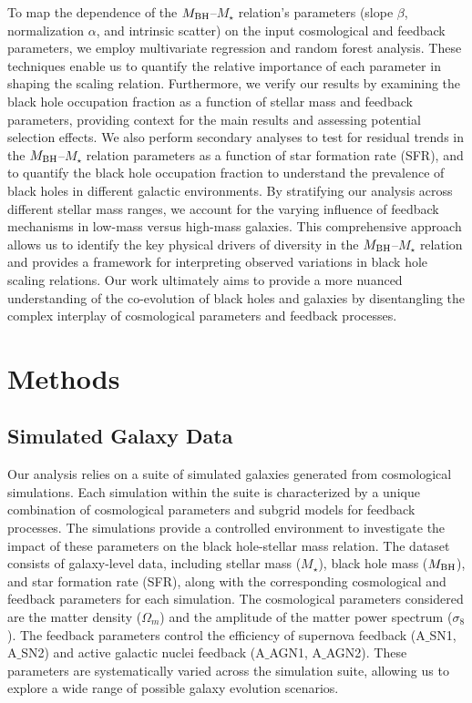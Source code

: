 \documentclass[twocolumn]{aastex631}
\begin{document}
To map the dependence of the $M_{\rm BH}$--$M_{\star}$ relation's parameters (slope $\beta$, normalization $\alpha$, and intrinsic scatter) on the input cosmological and feedback parameters, we employ multivariate regression and random forest analysis. These techniques enable us to quantify the relative importance of each parameter in shaping the scaling relation. Furthermore, we verify our results by examining the black hole occupation fraction as a function of stellar mass and feedback parameters, providing context for the main results and assessing potential selection effects. We also perform secondary analyses to test for residual trends in the $M_{\rm BH}$--$M_{\star}$ relation parameters as a function of star formation rate (SFR), and to quantify the black hole occupation fraction to understand the prevalence of black holes in different galactic environments. By stratifying our analysis across different stellar mass ranges, we account for the varying influence of feedback mechanisms in low-mass versus high-mass galaxies. This comprehensive approach allows us to identify the key physical drivers of diversity in the $M_{\rm BH}$--$M_{\star}$ relation and provides a framework for interpreting observed variations in black hole scaling relations. Our work ultimately aims to provide a more nuanced understanding of the co-evolution of black holes and galaxies by disentangling the complex interplay of cosmological parameters and feedback processes.

\section{Methods}
\label{sec:methods}
\subsection{Simulated Galaxy Data}

Our analysis relies on a suite of simulated galaxies generated from cosmological simulations. Each simulation within the suite is characterized by a unique combination of cosmological parameters and subgrid models for feedback processes. The simulations provide a controlled environment to investigate the impact of these parameters on the black hole-stellar mass relation. The dataset consists of galaxy-level data, including stellar mass ($M_{\star}$), black hole mass ($M_{\rm BH}$), and star formation rate (SFR), along with the corresponding cosmological and feedback parameters for each simulation. The cosmological parameters considered are the matter density ($\Omega_m$) and the amplitude of the matter power spectrum ($\sigma_8$). The feedback parameters control the efficiency of supernova feedback (A\ensuremath{\_}{SN1}, A\ensuremath{\_}{SN2}) and active galactic nuclei feedback (A\ensuremath{\_}{AGN1}, A\ensuremath{\_}{AGN2}). These parameters are systematically varied across the simulation suite, allowing us to explore a wide range of possible galaxy evolution scenarios.
\end{document}

